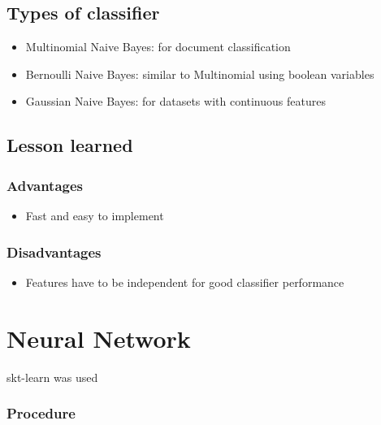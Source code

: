 \documentclass{article}
\begin{document}
\subsection{Types of classifier}
\begin{itemize}
	\item Multinomial Naive Bayes: for document classification
	\item Bernoulli Naive Bayes: similar to Multinomial using boolean variables
	\item Gaussian Naive Bayes: for datasets with continuous features
\end{itemize}

\subsection{Lesson learned}
\subsubsection{Advantages}
\begin{itemize}
	\item Fast and easy to implement
\end{itemize}
\subsubsection{Disadvantages}
\begin{itemize}
	\item Features have to be independent for good classifier performance
\end{itemize}


\section{Neural Network}
skt-learn was used 

\subsubsection{Procedure}
\end{document}
